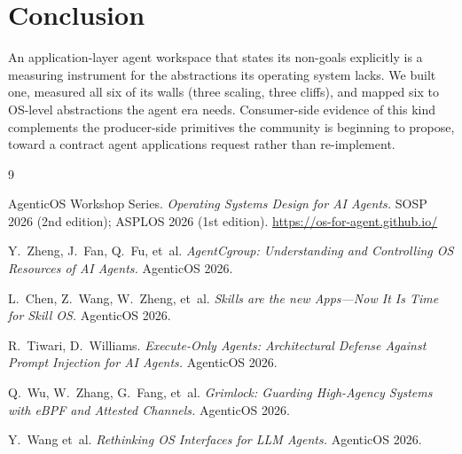 \documentclass[sigconf, review, anonymous]{acmart}
\begin{document}
\enlargethispage{2\baselineskip}

\section{Conclusion}

An application-layer agent workspace that states its non-goals explicitly is
a measuring instrument for the abstractions its operating system lacks. We
built one, measured all six of its walls (three scaling, three cliffs), and mapped
six to OS-level abstractions the agent era needs. Consumer-side evidence of
this kind complements the producer-side primitives the community is
beginning to propose, toward a contract agent applications request rather
than re-implement.

{\footnotesize
\begin{thebibliography}{9}

AgenticOS Workshop Series. \emph{Operating Systems Design for AI Agents.}
SOSP 2026 (2nd edition); ASPLOS 2026 (1st edition).
\url{https://os-for-agent.github.io/}

Y.~Zheng, J.~Fan, Q.~Fu, et~al.
\emph{AgentCgroup: Understanding and Controlling OS Resources of AI
Agents.} AgenticOS 2026.

L.~Chen, Z.~Wang, W.~Zheng, et~al.
\emph{Skills are the new Apps---Now It Is Time for Skill OS.}
AgenticOS 2026.

R.~Tiwari, D.~Williams. \emph{Execute-Only Agents: Architectural Defense
Against Prompt Injection for AI Agents.} AgenticOS 2026.

Q.~Wu, W.~Zhang, G.~Fang, et~al. \emph{Grimlock: Guarding High-Agency Systems
with eBPF and Attested Channels.} AgenticOS 2026.

Y.~Wang et~al. \emph{Rethinking OS Interfaces for LLM Agents.}
AgenticOS 2026.

\end{thebibliography}
}

\balance
\end{document}
